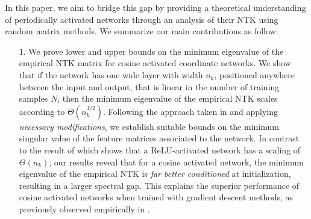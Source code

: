 \documentclass{article}
\theoremstyle{plain}
\theoremstyle{definition}
\theoremstyle{remark}
\begin{document}
In this paper, we aim to bridge this gap by providing a theoretical understanding of periodically activated networks through an analysis of their NTK using random matrix methods. We summarize our main contributions as follow:
\begin{enumerate}
    \item[1.] We prove lower and upper bounds on the minimum eigenvalue of the empirical NTK matrix for cosine activated coordinate networks.
    We show that if the network has one wide layer with width $n_k$, positioned anywhere between the input and output, that is linear in the number of training samples $N$, then the minimum eigenvalue of the empirical NTK scales according to $\Theta(n_k^{3/2})$.
    Following the approach taken in \cite{nguyen2020global, nguyen2021tight} and applying \textit{necessary modifications}, we establish suitable bounds on the minimum singular value of the feature matrices associated to the network. In contrast to the result of \cite{nguyen2021tight} which shows that a ReLU-activated network has a scaling of $\Theta(n_k)$, our results reveal that for a cosine activated network, the minimum eigenvalue of the empirical NTK is 
    \textit{far better conditioned} at initialization, resulting in a larger spectral gap. 
    This explains the superior performance of cosine activated networks when trained with gradient descent methods, as previously observed empirically in \cite{sitzmann2020implicit}.


\end{enumerate}
\end{document}
